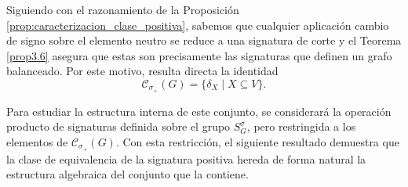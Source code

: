 \documentclass[11pt,a4paper,spanish]{report}
\theoremstyle{plain}
\begin{document}
Siguiendo con el razonamiento de la Proposición \ref{prop:caracterizacion_clase_positiva}, sabemos que cualquier aplicación cambio de signo sobre el elemento neutro se reduce a una signatura de corte y el Teorema \ref{prop3.6} asegura que estas son precisamente las signaturas que definen un grafo balanceado. Por este motivo, resulta directa la identidad
\[
\mathcal{C}_{\sigma_+}(G) = \{ \delta_X \mid X \subseteq V \}.
\]

Para estudiar la estructura interna de este conjunto, se considerará la operación producto de signaturas definida sobre el grupo $S_G^{\sigma}$, pero restringida a los elementos de $\mathcal{C}_{\sigma_+}(G)$. Con esta restricción, el siguiente resultado demuestra que la clase de equivalencia de la signatura positiva hereda de forma natural la estructura algebraica del conjunto que la contiene.
\end{document}
